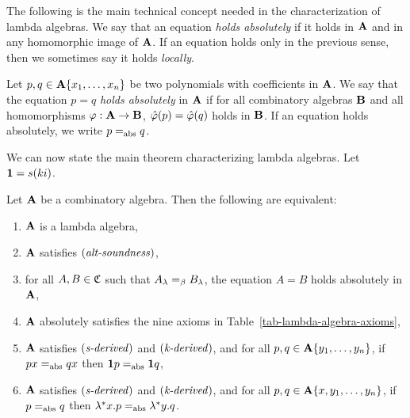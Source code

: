 \documentclass{article}
\begin{document}
The following is the main technical concept needed in the
characterization of lambda algebras. We say that an equation {\em
  holds absolutely} if it holds in ${\bf A}$ and in any homomorphic image
of ${\bf A}$. If an equation holds only in the previous sense, then we
sometimes say it holds {\em locally}.

\begin{definition}
  Let $p,q\in{\bf A}\{x_1,\ldots,x_n\}$ be two polynomials with
  coefficients in ${\bf A}$. We say that the equation $p=q$ {\em holds
    absolutely} in ${\bf A}$ if for all combinatory algebras ${\bf B}$ and all
  homomorphisms $\varphi:{\bf A}\to{\bf B}$, $\hat{\varphi}(p)=\hat{\varphi}(q)$ holds in ${\bf B}$.
  If an equation holds absolutely, we write $p=_{\rm abs} q$.
\end{definition}

We can now state the main theorem characterizing lambda algebras. Let
${\bf 1}=s(ki)$.

\begin{theorem}\label{thm-tfae-lambda-algebra}
  Let ${\bf A}$ be a combinatory algebra. Then the following are equivalent:
  \begin{enumerate}
  \item ${\bf A}$ is a lambda algebra,
  \item ${\bf A}$ satisfies $\textrm{(\textit{alt-soundness\/})}$,
  \item for all $A,B\in{\mathfrak C}$ such that $ A_\lambda =_{\beta} B_\lambda$, 
    the equation $A=B$ holds absolutely in ${\bf A}$,
  \item ${\bf A}$ absolutely satisfies the nine axioms in
    Table~\ref{tab-lambda-algebra-axioms},
  \item ${\bf A}$ satisfies $\textrm{(\textit{s-derived\/})}$ and $\textrm{(\textit{k-derived\/})}$,
    and for all $p,q\in{\bf A}\{y_1,\ldots,y_n\}$, if $px=_{\rm abs} qx$ then
    ${\bf 1} p=_{\rm abs} {\bf 1} q$,
  \item\label{thm-tfae-lambda-algebra6} ${\bf A}$ satisfies
    $\textrm{(\textit{s-derived\/})}$ and $\textrm{(\textit{k-derived\/})}$, and for all
    $p,q\in{\bf A}\{x,y_1,\ldots,y_n\}$, if $p=_{\rm abs} q$ then
    $\lambda^*x.p=_{\rm abs} \lambda^*y.q$.
  \end{enumerate}
\end{theorem}
\end{document}

